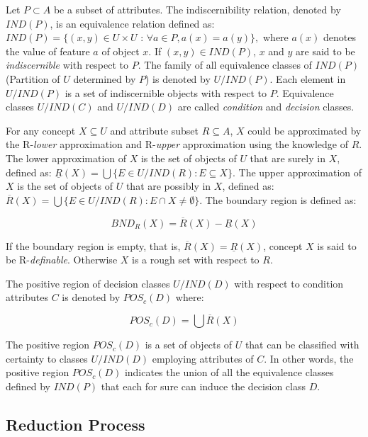\documentclass{llncs}
\begin{document}
Let $P \subset A$ be a subset of attributes. The indiscernibility relation, denoted by $IND(P)$, is an equivalence relation defined as: $IND(P) =  \{(x, y) \in U \times U \mbox{ : } \forall a \in P, a(x) = a(y)\},$ where $a(x)$ denotes the value of feature $a$ of object $x$. If $(x, y) \in IND(P)$, $x$ and $y$ are said to be \emph{indiscernible} with respect to $P$. The family of all equivalence classes of $IND(P)$ (Partition of $U$ determined by $P$) is denoted by $U/IND(P)$. Each element
in $U/IND(P)$ is a set of indiscernible objects with respect to $P$. Equivalence classes $U/IND(C)$ and $U/IND(D)$
are called \emph{condition} and \emph{decision} classes.


For any concept $X \subseteq U$ and attribute subset $R \subseteq A$, $X$ could be approximated by the R-\emph{lower} approximation and R-\emph{upper} approximation using the knowledge of $R$. The lower approximation of $X$ is the set of objects of $U$ that are surely in $X$, defined as: $ \underline{R}(X) = \bigcup \{E \in U/IND(R)  : E \subseteq X \}.$ The upper approximation of $X$ is the set of objects of $U$ that are possibly in $X$, defined as: $\overline{R}(X) = \bigcup \{E \in U/IND(R)  : E \cap X \ne \emptyset \}$. The boundary region is defined as:

\begin{displaymath}
BND_R(X) = \overline{R}(X) - \underline{R}(X)
\end{displaymath}

If the boundary region is empty, that is, $\overline{R}(X) = \underline{R}(X)$, concept $X$ is said to be R-\emph{definable}. Otherwise $X$ is a rough set with respect to $R$.

The positive region of decision classes $U/IND(D)$ with respect to condition attributes $C$ is denoted by $POS_c(D)$ where:

\begin{displaymath}
POS_c(D) = \bigcup \overline{R}(X)
\end{displaymath}

The positive region $POS_c(D)$ is a set of objects  of $U$ that can be classified with certainty to classes $U/IND(D)$ employing attributes of $C$. In other words, the positive region $POS_c(D)$ indicates the union of all the equivalence classes defined by $IND(P)$ that each for sure can induce the decision class $D$.

\subsection{Reduction Process}
\end{document}
